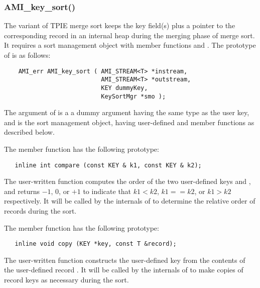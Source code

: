 \subsubsection{AMI\_key\_sort()}

The  variant of TPIE merge sort keeps
the key field(s) plus a pointer to the corresponding record
in an internal heap during the merging phase of merge sort.
It requires a sort management object with member functions
 and . The prototype of
 is as follows:

\begin{verbatim}
    AMI_err AMI_key_sort ( AMI_STREAM<T> *instream, 
                           AMI_STREAM<T> *outstream, 
                           KEY dummyKey, 
                           KeySortMgr *smo );
\end{verbatim}

The  argument of  is a a
dummy argument having the same type as the user key, and
 is the sort management
object, having user-defined  and
 member functions as described below.

The  member function has the following
prototype:
\begin{verbatim}
   inline int compare (const KEY & k1, const KEY & k2);
\end{verbatim}

The user-written  function computes the
order of the two user-defined keys  and
, and returns $-1$, $0$, or $+1$ to indicate that
$k1<k2$, $k1==k2$, or $k1>k2$ respectively.
It will be called by the internals of  to
determine the relative order of records during the sort.

The  member function has the following
prototype:
\begin{verbatim}
   inline void copy (KEY *key, const T &record);
\end{verbatim}

The user-written  function constructs the
user-defined key  from the contents of the
user-defined record . It will be called by the
internals of  to make copies of record
keys as necessary during the sort.



